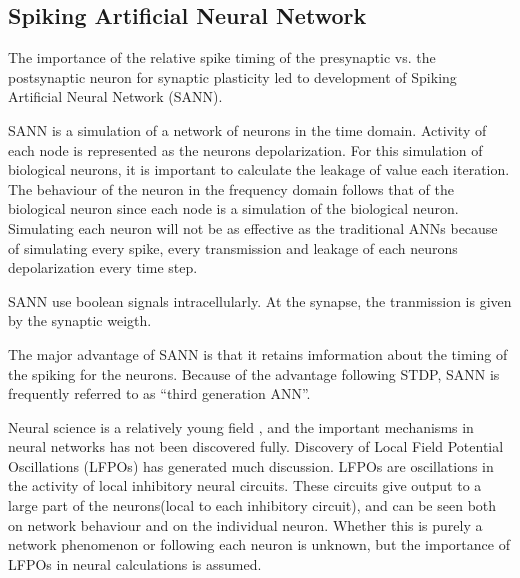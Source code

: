 \subsection{Spiking Artificial Neural Network}
The importance of the relative spike timing of the presynaptic vs. the postsynaptic neuron for synaptic plasticity led to development of Spiking Artificial Neural Network (SANN). 

SANN is a simulation of a network of neurons in the time domain. Activity of each node is represented as the neurons depolarization. For this simulation of biological neurons, it is important to calculate the leakage of value each iteration. 
The behaviour of the neuron in the frequency domain follows that of the biological neuron since each node is a simulation of the biological neuron. %
Simulating each neuron will not be as effective as the traditional ANNs because of simulating every spike, every transmission and leakage of each neurons depolarization every time step. 

SANN use boolean signals intracellularly. At the synapse, the tranmission is given by the synaptic weigth. 

The major advantage of SANN is that it retains imformation about the timing of the spiking for the neurons.  %
Because of the advantage following STDP, SANN is frequently referred to as ``third generation ANN''. 

Neural science is a relatively young field %
	, and the important mechanisms in neural networks has not been discovered fully. %
Discovery of Local Field Potential Oscillations (LFPOs) has generated much discussion. LFPOs are oscillations in the activity of local inhibitory neural circuits. 
These circuits give output to a large part of the neurons(local to each inhibitory circuit), and can be seen both on network behaviour and on the individual neuron. 
Whether this is purely a network phenomenon or following each neuron is unknown, but the importance of LFPOs in neural calculations is assumed. %


